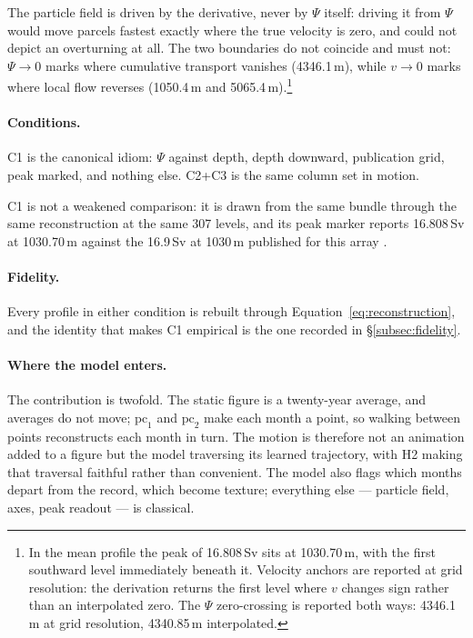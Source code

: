The particle field is driven by the derivative, never by $\Psi$ itself: driving it from $\Psi$ would move parcels fastest exactly where the true velocity is zero, and could not depict an overturning at all. The two boundaries do not coincide and must not: $\Psi \to 0$ marks where cumulative transport vanishes (4346.1\,m), while $v \to 0$ marks where local flow reverses (1050.4\,m and 5065.4\,m).\footnote{In the mean profile the peak of 16.808\,Sv sits at 1030.70\,m, with the first southward level immediately beneath it. Velocity anchors are reported at grid resolution: the derivation returns the first level where $v$ changes sign rather than an interpolated zero. The $\Psi$ zero-crossing is reported both ways: 4346.1\,m at grid resolution, 4340.85\,m interpolated.}

\paragraph{Conditions.} C1 is the canonical idiom: $\Psi$ against depth, depth downward, publication grid, peak marked, and nothing else. C2+C3 is the same column set in motion.

C1 is not a weakened comparison: it is drawn from the same bundle through the same reconstruction at the same 307 levels, and its peak marker reports 16.808\,Sv at 1030.70\,m against the 16.9\,Sv at 1030\,m published for this array \parencite{smeed2018}.

\paragraph{Fidelity.} Every profile in either condition is rebuilt through Equation~\ref{eq:reconstruction}, and the identity that makes C1 empirical is the one recorded in \S\ref{subsec:fidelity}.

\paragraph{Where the model enters.} The contribution is twofold. The static figure is a twenty-year average, and averages do not move; $\mathrm{pc}_1$ and $\mathrm{pc}_2$ make each month a point, so walking between points reconstructs each month in turn. The motion is therefore not an animation added to a figure but the model traversing its learned trajectory, with H2 making that traversal faithful rather than convenient. The model also flags which months depart from the record, which become texture; everything else --- particle field, axes, peak readout --- is classical.

